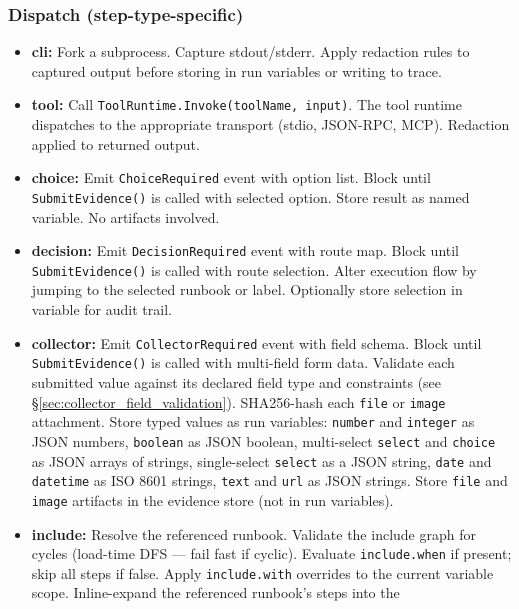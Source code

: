 \subsubsection*{Dispatch (step-type-specific)}
\begin{itemize}
  \item \textbf{cli:} Fork a subprocess. Capture stdout/stderr. Apply redaction rules to
        captured output before storing in run variables or writing to trace.
  \item \textbf{tool:} Call \texttt{ToolRuntime.Invoke(toolName, input)}. The tool runtime
        dispatches to the appropriate transport (stdio, JSON-RPC, MCP). Redaction applied
        to returned output.
  \item \textbf{choice:} Emit \texttt{ChoiceRequired} event with option list. Block until
        \texttt{SubmitEvidence()} is called with selected option. Store result as named
        variable. No artifacts involved.
  \item \textbf{decision:} Emit \texttt{DecisionRequired} event with route map. Block until
        \texttt{SubmitEvidence()} is called with route selection. Alter execution flow by
        jumping to the selected runbook or label. Optionally store selection in variable
        for audit trail.
  \item \textbf{collector:} Emit \texttt{CollectorRequired} event with field schema. Block
        until \texttt{SubmitEvidence()} is called with multi-field form data. Validate each
        submitted value against its declared field type and constraints (see
        §\ref{sec:collector_field_validation}). SHA256-hash each \texttt{file} or
        \texttt{image} attachment. Store typed values as run variables: \texttt{number} and
        \texttt{integer} as JSON numbers, \texttt{boolean} as JSON boolean, multi-select
        \texttt{select} and \texttt{choice} as JSON arrays of strings, single-select
        \texttt{select} as a JSON string, \texttt{date} and \texttt{datetime} as ISO 8601
        strings, \texttt{text} and \texttt{url} as JSON strings. Store \texttt{file} and
        \texttt{image} artifacts in the evidence store (not in run variables).
  \item \textbf{include:} Resolve the referenced runbook. Validate the include graph for
        cycles (load-time DFS — fail fast if cyclic). Evaluate \texttt{include.when} if
        present; skip all steps if false. Apply \texttt{include.with} overrides to the
        current variable scope. Inline-expand the referenced runbook's steps into the

\end{itemize}
